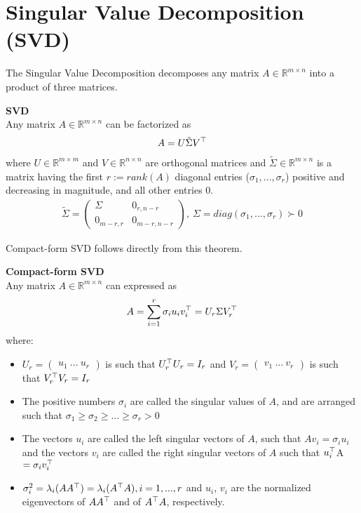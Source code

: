 \documentclass[12pt]{article}
\begin{document}
\section{Singular Value Decomposition (SVD)}
The Singular Value Decomposition decomposes any matrix $A \in \mathbb{R}^{m \times n}$ into a product of three matrices. 
\begin{theorem} \textbf{SVD}\\
Any matrix $A \in \mathbb{R}^{m \times n}$ can be factorized as \begin{gather*}
    A = U\tilde{\Sigma}V^\top
\end{gather*}
where $U \in \mathbb{R}^{m \times m}$ and $V \in \mathbb{R}^{n \times n}$ are orthogonal matrices and $\tilde{\Sigma} \in \mathbb{R}^{m \times n}$ is a matrix having the first $r := rank(A)$ diagonal entries ($\sigma_1, ..., \sigma_r$) positive and decreasing in magnitude, and all other entries $0$.
\begin{gather*}
    \tilde{\Sigma} = \begin{pmatrix} \Sigma & 0_{r, n-r} \\ 0_{m-r, r} & 0_{m-r, n-r}\end{pmatrix}, \ \Sigma = diag(\sigma_1, ..., \sigma_r)\succ 0
\end{gather*}
\end{theorem}
\noindent Compact-form SVD follows directly from this theorem.
\begin{corollary} \textbf{Compact-form SVD} \\
Any matrix $A \in \mathbb{R}^{m \times n}$ can expressed as
\begin{gather*}
    A = \sum_{i=1}^r \sigma_i u_iv_i^\top = U_r\Sigma V_r^\top
\end{gather*}
where:
\begin{itemize}
    \item $U_r = \begin{pmatrix} u_1 \ ... \ u_r \end{pmatrix}$ is such that $U_r^\top U_r = I_r$ and $V_r = \begin{pmatrix} v_1 \ ... \ v_r \end{pmatrix}$ is such that $V_r^\top V_r = I_r$
    \item The positive numbers $\sigma_i$ are called the singular values of $A$, and are arranged such that $\sigma_1 \geq \sigma_2 \geq ... \geq \sigma_r > 0$
    \item The vectors $u_i$ are called the left singular vectors of $A$, such that $Av_i= \sigma_iu_i$ and the vectors $v_i$ are called the right singular vectors of $A$ such that $u_i^\top$A$= \sigma_iv_i^\top$
    \item $\sigma_i^2=\lambda_i(AA^\top) =\lambda_i(A^\top A) , i= 1,...,r$ and $u_i$, $v_i$ are the normalized eigenvectors of $AA^\top$ and of $A^\top A$, respectively.
\end{itemize}
\end{corollary}
\end{document}
